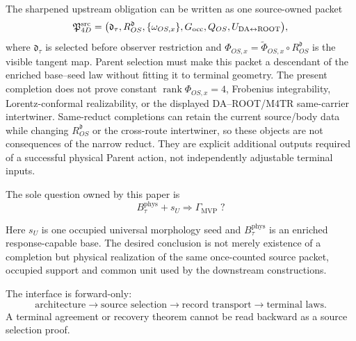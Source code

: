 \documentclass[11pt]{article}
\newcommand{\GMVP}{\Gamma_{\mathrm{MVP}}}
\begin{document}
The sharpened upstream obligation can be written as one source-owned packet
\begin{equation}
 \mathfrak P_{4D}^{\rm src}
 =\bigl(\mathfrak d_\tau,R^{\mathfrak d}_{OS},
        \{\omega_{OS,x}\},G_{\rm occ},Q_{OS},
        U_{\rm DA\leftrightarrow ROOT}\bigr),
 \label{eq:upstream-4d-source-packet}
\end{equation}
where $\mathfrak d_\tau$ is selected before observer restriction and
\(
 \Phi_{OS,x}=\widetilde\Phi_{OS,x}\circ R^{\mathfrak d}_{OS}
\)
is the visible tangent map.  Parent selection must make this packet a
descendant of the enriched base--seed law without fitting it to terminal
geometry.  The present completion does not prove constant
$\operatorname{rank}\Phi_{OS,x}=4$, Frobenius integrability,
Lorentz-conformal realizability, or the displayed DA--ROOT/M4TR
same-carrier intertwiner.  Same-reduct completions can retain the current
source/body data while changing $R^{\mathfrak d}_{OS}$ or the cross-route
intertwiner, so these objects are not consequences of the narrow reduct.
They are explicit additional outputs required of a successful physical
Parent action, not independently adjustable terminal inputs.

The sole question owned by this paper is
\begin{equation}
 B_\tau^{\mathrm{phys}}+s_U\Longrightarrow\GMVP\;?
 \label{eq:selection-question}
\end{equation}

\begin{center}
\end{center}
Here \(s_U\) is one occupied universal morphology seed and
\(B_\tau^{\mathrm{phys}}\) is an enriched response-capable base.  The desired
conclusion is not merely existence of a completion but physical realization of
the same once-counted source packet, occupied support and common unit used by
the downstream constructions.

The interface is forward-only:
\begin{equation}
 \text{architecture}\longrightarrow
 \text{source selection}\longrightarrow
 \text{record transport}\longrightarrow
 \text{terminal laws}.
\end{equation}
A terminal agreement or recovery theorem cannot be read backward as a source
selection proof.
\end{document}
